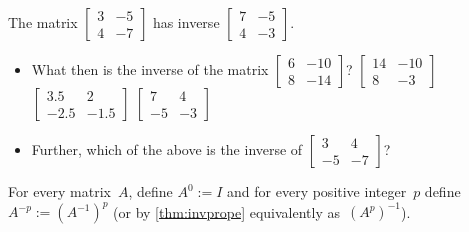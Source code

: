 \begin{activity}
The matrix \(\begin{bmatrix} 3&-5\\4&-7 \end{bmatrix}\) has inverse \(\begin{bmatrix} 7&-5\\4&-3 \end{bmatrix}\).
\begin{itemize}
\item What then is the inverse of the matrix \(\begin{bmatrix} 6&-10\\8&-14 \end{bmatrix}\)?
{\(\begin{bmatrix} 14&-10\\8&-3 \end{bmatrix}\)}
{\(\begin{bmatrix} 3.5&2\\-2.5&-1.5 \end{bmatrix}\)}
{\(\begin{bmatrix} 7&4\\-5&-3 \end{bmatrix}\)}
\item Further, which of the above is the inverse of \(\begin{bmatrix} 3&4\\-5&-7 \end{bmatrix}\)?
\end{itemize}
\end{activity}





\begin{definition} \label{def:invpow} 
For every  matrix~\(A\), define \(A^0:=I\) and for every positive integer~\(p\) define \(A^{-p}:=(A^{-1})^p\) (or by \cref{thm:invprope} equivalently as~\((A^p)^{-1}\)).
\end{definition}


